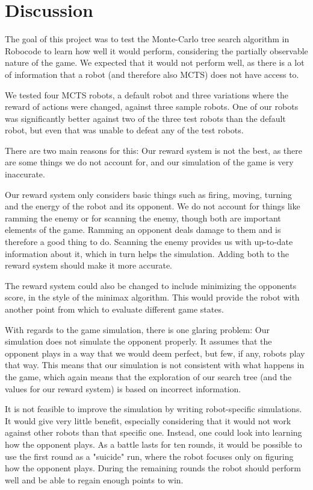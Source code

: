 \section{Discussion}
\label{06}

The goal of this project was to test the Monte-Carlo tree search algorithm in Robocode to learn how well it would perform, considering the partially observable nature of the game. We expected that it would not perform well, as there is a lot of information that a robot (and therefore also MCTS) does not have access to.

We tested four MCTS robots, a default robot and three variations where the reward of actions were changed, against three sample robots. One of our robots was significantly better against two of the three test robots than the default robot, but even that was unable to defeat any of the test robots.

There are two main reasons for this: Our reward system is not the best, as there are some things we do not account for, and our simulation of the game is very inaccurate.

Our reward system only considers basic things such as firing, moving, turning and the energy of the robot and its opponent. We do not account for things like ramming the enemy or for scanning the enemy, though both are important elements of the game. Ramming an opponent deals damage to them and is therefore a good thing to do. Scanning the enemy provides us with up-to-date information about it, which in turn helps the simulation. Adding both to the reward system should make it more accurate.

The reward system could also be changed to include minimizing the opponents score, in the style of the minimax algorithm\cite{pinto2002introducing}. This would provide the robot with another point from which to evaluate different game states.

With regards to the game simulation, there is one glaring problem: Our simulation does not simulate the opponent properly. It assumes that the opponent plays in a way that we would deem perfect, but few, if any, robots play that way. This means that our simulation is not consistent with what happens in the game, which again means that the exploration of our search tree (and the values for our reward system) is based on incorrect information.

It is not feasible to improve the simulation by writing robot-specific simulations. It would give very little benefit, especially considering that it would not work against other robots than that specific one. Instead, one could look into learning how the opponent plays. As a battle lasts for ten rounds, it would be possible to use the first round as a "suicide" run, where the robot focuses only on figuring how the opponent plays. During the remaining rounds the robot should perform well and be able to regain enough points to win.

